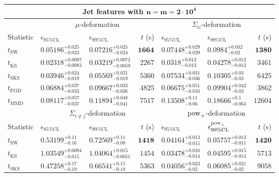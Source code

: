 \begin{tabular}{l|llr|llr}
	\toprule
	\multicolumn{7}{c}{{\bf Jet features with $\mathbf{n=m=2\cdot 10^{4}}$}} \\
	\toprule
	\multicolumn{1}{c}{} & \multicolumn{3}{c}{$\mu$-deformation} & \multicolumn{3}{c}{$\Sigma_{ii}$-deformation} \\
	Statistic & $\epsilon_{95\%\mathrm{CL}}$ & $\epsilon_{99\%\mathrm    {CL}}$ & $t$ (s) & $\epsilon_{95\%\mathrm{CL}}$ & $\epsilon_{99\%\mathrm{CL}}$ & $t$ (s) \\
	\midrule
	$t_{\mathrm{SW}}$ & $0.05186_{-0.023}^{+0.025}$ & $0.07216_{-0.024}^{+0.025}$ & ${\mathbf{1664}}$ & $0.07448_{-0.029}^{+0.029}$ & $0.0984_{-0.02}^{+0.032}$ & ${\mathbf{1380}}$ \\
	$t_{\overline{\mathrm{KS}}}$ & ${\mathbf{0.02318_{-0.0083}^{+0.0087}}}$ & ${\mathbf{0.03219_{-0.0059}^{+0.0072}}}$ & $2267$ & ${\mathbf{0.0318_{-0.013}^{+0.013}}}$ & ${\mathbf{0.04278_{-0.012}^{+0.012}}}$ & $3461$ \\
	$t_{\mathrm{SKS}}$ & $0.03946_{-0.019}^{+0.024}$ & $0.05569_{-0.019}^{+0.021}$ & $5360$ & $0.07534_{-0.036}^{+0.031}$ & $0.10305_{-0.03}^{+0.03}$ & $6425$ \\
	$t_{\mathrm{FGD}}$ & $0.06884_{-0.033}^{+0.037}$ & $0.09667_{-0.026}^{+0.033}$ & $4825$ & $0.06675_{-0.033}^{+0.051}$ & $0.09904_{-0.03}^{+0.042}$ & $3862$ \\
	$t_{\mathrm{MMD}}$ & $0.08117_{-0.037}^{+0.057}$ & $0.11894_{-0.041}^{+0.048}$ & $7517$ & $0.13508_{-0.06}^{+0.11}$ & $0.18666_{-0.063}^{+0.1}$ & $12604$ \\
	\toprule
	\multicolumn{1}{c}{} & \multicolumn{3}{c}{$\Sigma_{i\neq j}$-deformation} & \multicolumn{3}{c}{$\rm{pow}_{+}$-deformation} \\
	Statistic & $\epsilon_{95\%\mathrm{CL}}$ & $\epsilon_{99\%\mathrm{CL}}$ & $t$ (s) & $\epsilon_{95\%\mathrm{CL}}$ & $\epsilon^{\rm   {pow}_{+}}_{99\%\mathrm{CL}}$ & $t$ (s) \\
	\midrule
	$t_{\mathrm{SW}}$ & $0.53199_{-0.16}^{+0.11}$ & $0.72569_{-0.08}^{+0.11}$ & ${\mathbf{1418}}$ & $0.04164_{-0.015}^{+0.013}$ & $0.05757_{-0.011}^{+0.013}$ & ${\mathbf{1420}}$ \\
	$t_{\overline{\mathrm{KS}}}$ & $1.03549_{-0.015}^{+0.0094}$ & $1.04064_{-0.0051}^{+0.015}$ & $1454$ & $0.03478_{-0.014}^{+0.016}$ & ${\mathbf{0.04595_{-0.014}^{+0.015}}}$ & $5713$ \\
	$t_{\mathrm{SKS}}$ & $0.47258_{-0.19}^{+0.17}$ & $0.66541_{-0.18}^{+0.15}$ & $5363$ & $0.04056_{-0.02}^{+0.023}$ & $0.06085_{-0.02}^{+0.021}$ & $9058$ \\

\end{tabular}
